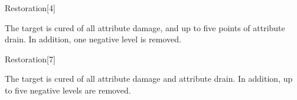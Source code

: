 \begin{spellsection}{Restoration}[4]
    \begin{spellheader}
    \end{spellheader}
    \begin{spellcontent}
        \begin{spelltargetinginfo}
        \end{spelltargetinginfo}
        \begin{spelleffects}

            \spelleffect The target is cured of all attribute damage, and up to five points of attribute drain. In addition, one negative level is removed.
        \end{spelleffects}
    \end{spellcontent}
    \begin{spellfooter}
    \end{spellfooter}
\end{spellsection}

\begin{spellsection}[Greater]{Restoration}[7]
    \begin{spellheader}
    \end{spellheader}
    \begin{spellcontent}
        \begin{spelltargetinginfo}
        \end{spelltargetinginfo}
        \begin{spelleffects}

            \spelleffect The target is cured of all attribute damage and attribute drain. In addition, up to five negative levels are removed.
        \end{spelleffects}
    \end{spellcontent}
    \begin{spellfooter}
    \end{spellfooter}
\end{spellsection}

